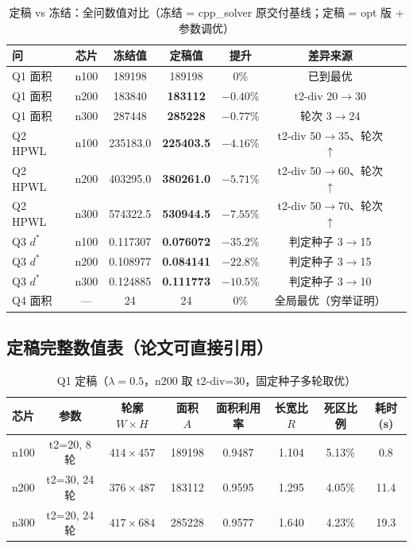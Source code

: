 \documentclass[12pt,a4paper]{article}
\begin{document}
\begin{table}[H]
\centering
\small
\caption{定稿 vs 冻结：全问数值对比（冻结 = cpp\_solver 原交付基线；定稿 = opt 版 + 参数调优）}
\begin{tabular}{lcccccc}
\toprule
问 & 芯片 & 冻结值 & 定稿值 & 提升 & 差异来源 \\
\midrule
Q1 面积 & n100 & 189198 & 189198 & $0\%$ & 已到最优 \\
Q1 面积 & n200 & 183840 & \textbf{183112} & $-0.40\%$ & t2-div 20$\to$30 \\
Q1 面积 & n300 & 287448 & \textbf{285228} & $-0.77\%$ & 轮次 3$\to$24 \\
\midrule
Q2 HPWL & n100 & 235183.0 & \textbf{225403.5} & $-4.16\%$ & t2-div 50$\to$35、轮次 $\uparrow$ \\
Q2 HPWL & n200 & 403295.0 & \textbf{380261.0} & $-5.71\%$ & t2-div 50$\to$60、轮次 $\uparrow$ \\
Q2 HPWL & n300 & 574322.5 & \textbf{530944.5} & $-7.55\%$ & t2-div 50$\to$70、轮次 $\uparrow$ \\
\midrule
Q3 $d^*$ & n100 & 0.117307 & \textbf{0.076072} & $-35.2\%$ & 判定种子 3$\to$15 \\
Q3 $d^*$ & n200 & 0.108977 & \textbf{0.084141} & $-22.8\%$ & 判定种子 3$\to$15 \\
Q3 $d^*$ & n300 & 0.124885 & \textbf{0.111773} & $-10.5\%$ & 判定种子 3$\to$10 \\
\midrule
Q4 面积 & --- & 24 & 24 & $0\%$ & 全局最优（穷举证明） \\
\bottomrule
\end{tabular}
\end{table}

\subsection{定稿完整数值表（论文可直接引用）}

\begin{table}[H]
\centering
\small
\caption{Q1 定稿（$\lambda=0.5$，n200 取 t2-div=30，固定种子多轮取优）}
\setlength{\tabcolsep}{3pt}
\begin{tabular}{lccccccc}
\toprule
芯片 & 参数 & 轮廓 $W\times H$ & 面积 $A$ & 面积利用率 & 长宽比 $R$ & 死区比例 & 耗时(s) \\
\midrule
n100 & t2=20, 8轮 & $414\times457$ & 189198 & 0.9487 & 1.104 & 5.13\% & 0.8 \\
n200 & t2=30, 24轮 & $376\times487$ & 183112 & 0.9595 & 1.295 & 4.05\% & 11.4 \\
n300 & t2=20, 24轮 & $417\times684$ & 285228 & 0.9577 & 1.640 & 4.23\% & 19.3 \\
\bottomrule
\end{tabular}
\end{table}
\end{document}
